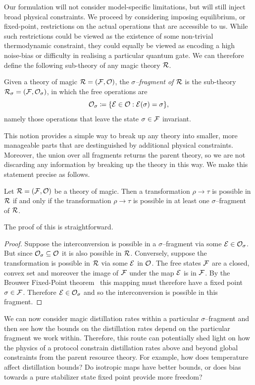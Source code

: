 \documentclass[pra,
aps,
twocolumn,
superscriptaddress,
groupedaddress,
nofootinbib,
reprint
]{revtex4-1}
\begin{document}
Our formulation will not consider model-specific limitations, but will still inject broad physical constraints. We proceed by considering imposing equilibrium, or fixed-point, restrictions on the actual operations that are accessible to us. While such restrictions could be viewed as the existence of some non-trivial thermodynamic constraint, they could equally be viewed as encoding a high noise-bias or difficulty in realising a particular quantum gate. We can therefore define the following sub-theory of any magic theory $\mathcal{R}$.
\begin{definition}\label{def:sigmafrag}
   Given a theory of magic $\mathcal{R} = (\mathcal{F}, \mathcal{O})$, the \emph{$\sigma$--fragment of $\mathcal{R}$} is the sub-theory $\mathcal{R}_\sigma = (\mathcal{F}, \mathcal{O}_\sigma)$, in which the free operations are 
   \begin{equation}
        \mathcal{O}_\sigma \coloneqq \{ \mathcal{E} \in \mathcal{O}: \mathcal{E}(\sigma) = \sigma \},
    \end{equation}
namely those operations that leave the state $\sigma \in \mathcal{F}$ invariant.
\end{definition}
This notion provides a simple way to break up any theory into smaller, more manageable parts that are destinguished by additional physical constraints. Moreover, the union over all fragments returns the parent theory, so we are not discarding any information by breaking up the theory in this way. We make this statement precise as follows.
\begin{theorem}\label{thm:frag}
    Let $\mathcal{R} = (\mathcal{F}, \mathcal{O})$ be a theory of magic.
Then a transformation $\rho \longrightarrow \tau$ is possible in $\mathcal{R}$ if and only if the transformation $\rho \longrightarrow \tau$ is possible in at least one $\sigma$--fragment of $\mathcal{R}$.
\end{theorem}
The proof of this is straightforward.
\begin{proof}
    Suppose the interconversion is possible in a $\sigma$--fragment via some $\mathcal{E} \in \mathcal{O}_\sigma$. But since $\mathcal{O}_\sigma \subseteq \mathcal{O}$ it is also possible in $\mathcal{R}$. Conversely, suppose the transformation is possible in $\mathcal{R}$ via some $\mathcal{E}$ in $\mathcal{O}$. The free states $\mathcal{F}$ are a closed, convex set and moreover the image of $\mathcal{F}$ under the map $\mathcal{E}$ is in $\mathcal{F}$. By the Brouwer Fixed-Point theorem~\cite{cit:brouwer} this mapping must therefore have a fixed point $\sigma \in \mathcal{F}$. Therefore $\mathcal{E} \in \mathcal{O}_\sigma$ and so the interconversion is possible in this fragment.
\end{proof}

We can now consider magic distillation rates within a particular $\sigma$--fragment and then see how the bounds on the distillation rates depend on the particular fragment we work within. Therefore, this route can potentially shed light on how the physics of a protocol constrain distillation rates above and beyond global constraints from the parent resource theory. For example, how does temperature affect distillation bounds? Do isotropic maps have better bounds, or does bias towards a pure stabilizer state fixed point provide more freedom?
\end{document}
